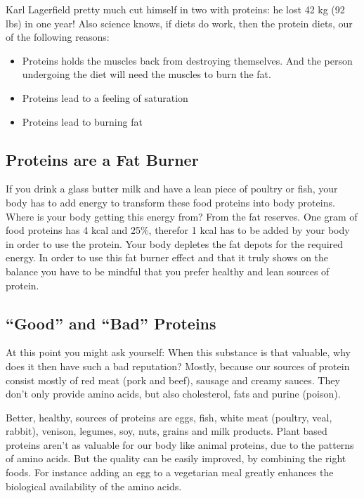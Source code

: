 \documentclass[../main.tex]{subfiles}
\begin{document}
  Karl Lagerfield pretty much cut himself in two with proteins: he lost 42 kg (92 lbs) in one year!
  Also science knows, if diets do work, then the protein diets, our of the following reasons:
  \begin{itemize}
  \item Proteins holds the muscles back from destroying themselves. And the person undergoing the diet will need the muscles  to burn the fat.
  \item Proteins lead to a feeling of saturation
    \item Proteins lead to burning fat
    \end{itemize}

    \subsection{Proteins are a Fat Burner}

    If you drink a glass butter milk and have a lean piece of poultry or fish, your body has to add energy to transform these food proteins into body proteins.
    Where is your body getting this energy from? From the fat reserves.
    One gram of food proteins has 4 kcal and 25\%, therefor 1 kcal has to be added by your body in order to use the protein.
    Your body depletes the fat depots for the required energy.
    In order to use this fat burner effect and that it truly shows on the balance you have to be mindful that you prefer healthy and lean sources of protein.

    \subsection{``Good'' and ``Bad'' Proteins}

    At this point you might ask yourself: When this substance is that valuable, why does it then have such a bad reputation?
    Mostly, because our sources of protein consist mostly of red meat (pork and beef), sausage and creamy sauces.
    They don't only provide amino acids, but also cholesterol, fats and purine (poison).

    Better, healthy, sources of proteins are eggs, fish, white meat (poultry, veal, rabbit), venison, legumes, soy, nuts, grains and milk products.
    Plant based proteins aren't as valuable for our body like animal proteins, due to the patterns of amino acids.
    But the quality can be easily improved, by combining the right foods. For instance adding an egg to a vegetarian meal greatly enhances the
    biological availability of the amino acids.
\end{document}
